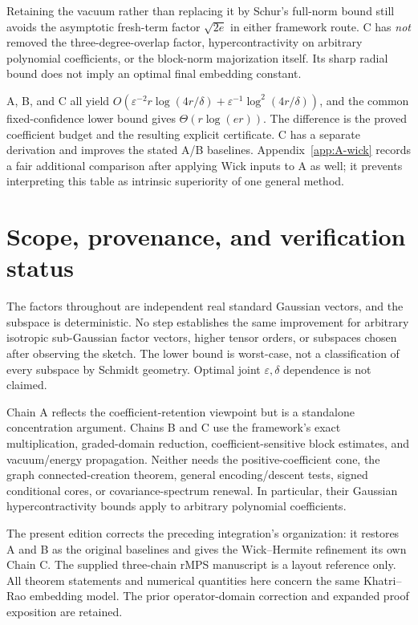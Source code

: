 \documentclass[11pt]{article}
\numberwithin{equation}{section}
\theoremstyle{definition}\newtheorem{definition}[theorem]{Definition}
\theoremstyle{remark}\newtheorem{remark}[theorem]{Remark}
\begin{document}
Retaining the vacuum rather than replacing it by Schur's full-norm bound
still avoids the asymptotic fresh-term factor $\sqrt{2e}$ in either framework
route. C has \emph{not} removed the three-degree-overlap factor, hypercontractivity
on arbitrary polynomial coefficients, or the block-norm majorization itself.
Its sharp radial bound does not imply an optimal final embedding constant.

\begin{takeaway}[title={Same endpoint, a distinguishable hybrid}]
A, B, and C all yield
$O(\varepsilon^{-2}r\log(4r/\delta)+\varepsilon^{-1}\log^2(4r/\delta))$,
and the common fixed-confidence lower bound gives $\Theta(r\log(er))$.
The difference is the proved coefficient budget and the resulting explicit
certificate. C has a separate derivation and improves the stated A/B baselines.
Appendix~\ref{app:A-wick} records a fair additional comparison after applying
Wick inputs to A as well; it prevents interpreting this table as intrinsic
superiority of one general method.
\end{takeaway}
\section{Scope, provenance, and verification status}\label{sec:scope}
The factors throughout are independent real standard Gaussian vectors, and the
subspace is deterministic. No step establishes the same improvement for arbitrary
isotropic sub-Gaussian factor vectors, higher tensor orders, or subspaces chosen
after observing the sketch. The lower bound is worst-case, not a classification
of every subspace by Schmidt geometry. Optimal joint $\varepsilon,\delta$
dependence is not claimed.

Chain A reflects the coefficient-retention viewpoint but is a standalone
concentration argument. Chains B and C use the framework's exact multiplication,
graded-domain reduction, coefficient-sensitive block estimates, and vacuum/energy
propagation. Neither needs the positive-coefficient cone, the graph
connected-creation theorem, general encoding/descent tests, signed conditional
cores, or covariance-spectrum renewal. In particular, their Gaussian
hypercontractivity bounds apply to arbitrary polynomial coefficients.

The present edition corrects the preceding integration's organization: it
restores A and B as the original baselines and gives the Wick--Hermite
refinement its own Chain C. The supplied three-chain rMPS manuscript is a
layout reference only. All theorem statements and numerical quantities here
concern the same Khatri--Rao embedding model. The prior operator-domain
correction and expanded proof exposition are retained.
\end{document}
